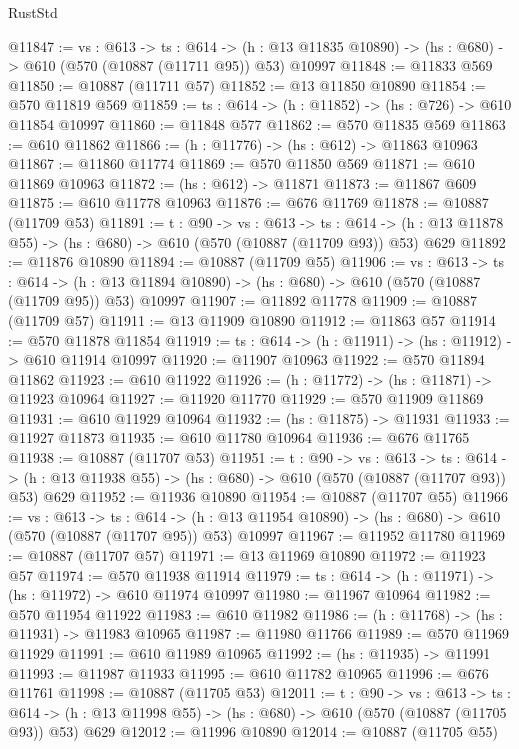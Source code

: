 \begin{lexlean}{RustStd}
\begin{coremodule}
@11847 := {vs : @613} ->
  {ts : @614} ->
  (h : @13 @11835 @10890) -> (hs : @680) -> @610 (@570 (@10887 (@11711 @95)) @53) @10997
@11848 := @11833 @569
@11850 := @10887 (@11711 @57)
@11852 := @13 @11850 @10890
@11854 := @570 @11819 @569
@11859 := {ts : @614} -> (h : @11852) -> (hs : @726) -> @610 @11854 @10997
@11860 := @11848 @577
@11862 := @570 @11835 @569
@11863 := @610 @11862
@11866 := (h : @11776) -> (hs : @612) -> @11863 @10963
@11867 := @11860 @11774
@11869 := @570 @11850 @569
@11871 := @610 @11869 @10963
@11872 := (hs : @612) -> @11871
@11873 := @11867 @609
@11875 := @610 @11778 @10963
@11876 := @676 @11769
@11878 := @10887 (@11709 @53)
@11891 := {t : @90} ->
  {vs : @613} ->
  {ts : @614} -> (h : @13 @11878 @55) -> (hs : @680) -> @610 (@570 (@10887 (@11709 @93)) @53) @629
@11892 := @11876 @10890
@11894 := @10887 (@11709 @55)
@11906 := {vs : @613} ->
  {ts : @614} ->
  (h : @13 @11894 @10890) -> (hs : @680) -> @610 (@570 (@10887 (@11709 @95)) @53) @10997
@11907 := @11892 @11778
@11909 := @10887 (@11709 @57)
@11911 := @13 @11909 @10890
@11912 := @11863 @57
@11914 := @570 @11878 @11854
@11919 := {ts : @614} -> (h : @11911) -> (hs : @11912) -> @610 @11914 @10997
@11920 := @11907 @10963
@11922 := @570 @11894 @11862
@11923 := @610 @11922
@11926 := (h : @11772) -> (hs : @11871) -> @11923 @10964
@11927 := @11920 @11770
@11929 := @570 @11909 @11869
@11931 := @610 @11929 @10964
@11932 := (hs : @11875) -> @11931
@11933 := @11927 @11873
@11935 := @610 @11780 @10964
@11936 := @676 @11765
@11938 := @10887 (@11707 @53)
@11951 := {t : @90} ->
  {vs : @613} ->
  {ts : @614} -> (h : @13 @11938 @55) -> (hs : @680) -> @610 (@570 (@10887 (@11707 @93)) @53) @629
@11952 := @11936 @10890
@11954 := @10887 (@11707 @55)
@11966 := {vs : @613} ->
  {ts : @614} ->
  (h : @13 @11954 @10890) -> (hs : @680) -> @610 (@570 (@10887 (@11707 @95)) @53) @10997
@11967 := @11952 @11780
@11969 := @10887 (@11707 @57)
@11971 := @13 @11969 @10890
@11972 := @11923 @57
@11974 := @570 @11938 @11914
@11979 := {ts : @614} -> (h : @11971) -> (hs : @11972) -> @610 @11974 @10997
@11980 := @11967 @10964
@11982 := @570 @11954 @11922
@11983 := @610 @11982
@11986 := (h : @11768) -> (hs : @11931) -> @11983 @10965
@11987 := @11980 @11766
@11989 := @570 @11969 @11929
@11991 := @610 @11989 @10965
@11992 := (hs : @11935) -> @11991
@11993 := @11987 @11933
@11995 := @610 @11782 @10965
@11996 := @676 @11761
@11998 := @10887 (@11705 @53)
@12011 := {t : @90} ->
  {vs : @613} ->
  {ts : @614} -> (h : @13 @11998 @55) -> (hs : @680) -> @610 (@570 (@10887 (@11705 @93)) @53) @629
@12012 := @11996 @10890
@12014 := @10887 (@11705 @55)

\end{coremodule}
\end{lexlean}
